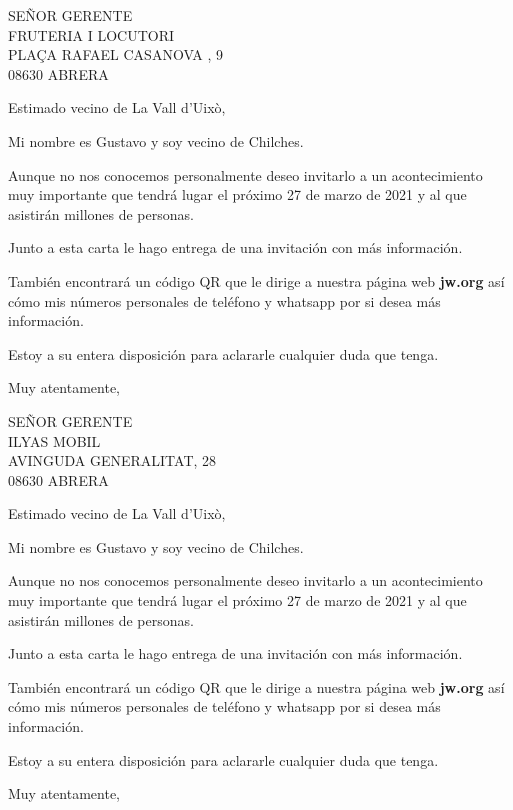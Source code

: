 \documentclass{scrlttr2}
\date{\today}
\begin{document}
\begin{letter}{%
SEÑOR GERENTE\\
FRUTERIA I LOCUTORI\\
PLAÇA RAFAEL CASANOVA , 9\\
08630 ABRERA\\
}
\opening{Estimado vecino de La Vall d'Uixò,}



Mi nombre es Gustavo y soy vecino de Chilches. 

Aunque no nos conocemos personalmente deseo invitarlo a un acontecimiento muy importante que tendrá lugar el próximo 27 de marzo de 2021 y al que asistirán millones de personas.

Junto a esta carta le hago entrega de una invitación con más información.

También encontrará un código QR que le dirige a nuestra página web \textbf{jw.org} así cómo mis números personales de teléfono y whatsapp por si desea más información.

Estoy a su entera disposición para aclararle cualquier duda que tenga.
\closing{Muy atentamente,}




\end{letter}
\begin{letter}{%
SEÑOR GERENTE\\
ILYAS MOBIL\\
AVINGUDA GENERALITAT, 28\\
08630 ABRERA\\
}
\opening{Estimado vecino de La Vall d'Uixò,}



Mi nombre es Gustavo y soy vecino de Chilches. 

Aunque no nos conocemos personalmente deseo invitarlo a un acontecimiento muy importante que tendrá lugar el próximo 27 de marzo de 2021 y al que asistirán millones de personas.

Junto a esta carta le hago entrega de una invitación con más información.

También encontrará un código QR que le dirige a nuestra página web \textbf{jw.org} así cómo mis números personales de teléfono y whatsapp por si desea más información.

Estoy a su entera disposición para aclararle cualquier duda que tenga.
\closing{Muy atentamente,}




\end{letter}
\end{document}
